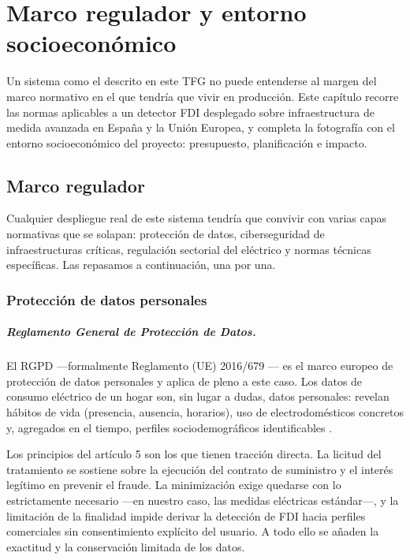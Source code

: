 \chapter{Marco regulador y entorno socioeconómico}
\label{cap:regulador}

Un sistema como el descrito en este TFG no puede entenderse al margen del marco normativo en el que tendría que vivir en producción. Este capítulo recorre las normas aplicables a un detector FDI desplegado sobre infraestructura de medida avanzada en España y la Unión Europea, y completa la fotografía con el entorno socioeconómico del proyecto: presupuesto, planificación e impacto.

\section{Marco regulador}
\label{sec:regulador}

Cualquier despliegue real de este sistema tendría que convivir con varias capas normativas que se solapan: protección de datos, ciberseguridad de infraestructuras críticas, regulación sectorial del eléctrico y normas técnicas específicas. Las repasamos a continuación, una por una.

\subsection{Protección de datos personales}

\paragraph{Reglamento General de Protección de Datos.} El RGPD ---formalmente Reglamento (UE) 2016/679 \cite{rgpd2016}--- es el marco europeo de protección de datos personales y aplica de pleno a este caso. Los datos de consumo eléctrico de un hogar son, sin lugar a dudas, datos personales: revelan hábitos de vida (presencia, ausencia, horarios), uso de electrodomésticos concretos y, agregados en el tiempo, perfiles sociodemográficos identificables \cite{molina2010private}.

Los principios del artículo 5 son los que tienen tracción directa. La licitud del tratamiento se sostiene sobre la ejecución del contrato de suministro y el interés legítimo en prevenir el fraude. La minimización exige quedarse con lo estrictamente necesario ---en nuestro caso, las medidas eléctricas estándar---, y la limitación de la finalidad impide derivar la detección de FDI hacia perfiles comerciales sin consentimiento explícito del usuario. A todo ello se añaden la exactitud y la conservación limitada de los datos.

